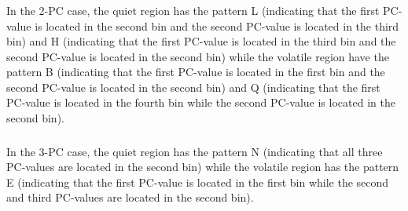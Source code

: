 \documentclass{beamer}
\begin{document}

\begin{frame}
\frametitle{}

In the 2-PC case, the quiet region has the pattern L (indicating
that the first PC-value is located in the second bin and the
second PC-value is located in the third bin) and H (indicating
that the first PC-value is located in the third bin and the
second PC-value is located in the second bin) while the
volatile region have the pattern B (indicating that the first
PC-value is located in the first bin and the second PC-value is
located in the second bin) and Q (indicating that the first
PC-value is located in the fourth bin while the second PC-value
is located in the second bin).


\end{frame}
\begin{frame}
\frametitle{}
In the 3-PC case, the quiet region has the pattern N (indicating that all three PC-values are  located
in the second bin) while the volatile region has the pattern E (indicating that the first PC-value is located
in the first bin while the second and third PC-values are located in the second bin).




\end{frame}
\end{document}
